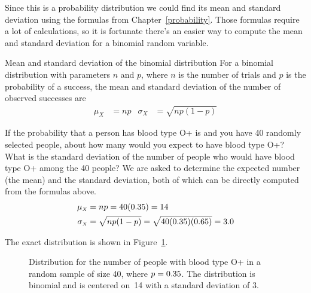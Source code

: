 Since this is a probability distribution we could find its mean and
standard deviation using the formulas from Chapter~\ref{probability}.
Those formulas require a lot of calculations, so it is fortunate there's
an easier way to compute the mean and standard deviation for a binomial
random variable.

\begin{onebox}{Mean and standard deviation of the binomial distribution}
For a binomial distribution with parameters $n$ and $p$, where $n$ is the number of trials and $p$ is the probability of a success, the mean and standard deviation of the number of observed successes are\vspace{-2mm}
\begin{align*}
\mu_{\scriptscriptstyle{X}} &= np
	&\sigma_{\scriptscriptstyle{X}} &= \sqrt{np(1-p)}
\end{align*}
\end{onebox}

\begin{examplewrap}
\begin{nexample}{If the probability that a person has blood type O+ is \oposprob{} and you have 40 randomly selected people, about how many would you expect to have blood type O+? What is the standard deviation of the number of people who would have blood type O+ among the 40 people?}
We are asked to determine the expected number (the mean) and the standard deviation, both of which can be directly computed from the formulas above. 
 \begin{align*}
\mu_{\scriptscriptstyle{X}}&=np = 40(0.35{}) = 14 \\
 \sigma_{\scriptscriptstyle{X}} &= \sqrt{np(1-p)} = \sqrt{40(0.35{})(0.65{})} = 3.0
\end{align*}%
\end{nexample}
\end{examplewrap}

The exact distribution is shown in Figure~\ref{oPositive40}.

\begin{figure}[ht]
\centering
{}
\caption{Distribution for the number of people with blood type O+ in a random sample of size 40, where $p=0.35{}$.  The distribution is binomial and is centered on~14 with a standard deviation of 3.  }
\label{oPositive40}
\end{figure}


